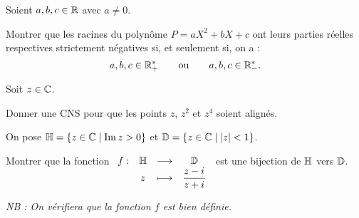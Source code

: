 \begin{corr}
\end{corr}

\begin{exo}
Soient \(a,b,c\in\mathbb{R}\) avec \(a\not=0\).

Montrer que les racines du polynôme \(P=aX^2+bX+c\) ont leurs parties réelles respectives strictement négatives si, et seulement si, on a : \[a,b,c\in\mathbb{R}_+^*\qquad\text{ou}\qquad a,b,c\in\mathbb{R}_-^*.\]
\end{exo}

\begin{corr}
\end{corr}

\begin{exo}
Soit \(z\in\mathbb{C}\).

Donner une CNS pour que les points \(z\), \(z^2\) et \(z^4\) soient alignés.
\end{exo}

\begin{corr}
\end{corr}

\begin{exo}
On pose \(\mathbb{H}=\left\lbrace z\in\mathbb{C}\;\middle|\;\operatorname{Im} z>0\right\rbrace\) et \(\mathbb{D}=\left\lbrace z\in\mathbb{C}\;\middle|\;\left\lvert z\right\rvert<1\right\rbrace\).

Montrer que la fonction \(\begin{array}[t]{cccc}f : & \mathbb{H} & \longrightarrow & \mathbb{D} \\ & z & \longmapsto & \dfrac{z-i\mkern1mu}{z+i\mkern1mu}\end{array}\) est une bijection de \(\mathbb{H}\) vers \(\mathbb{D}\).

\textit{NB : On vérifiera que la fonction \(f\) est bien définie.}
\end{exo}

\begin{corr}
\end{corr}